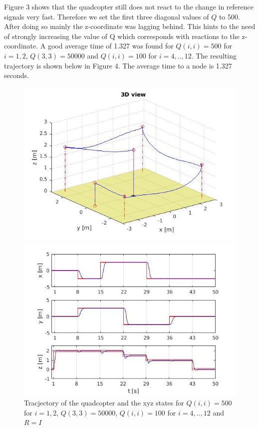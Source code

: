 \documentclass[]{article}
\begin{document}
Figure 3 shows that the quadcopter still does not react to the change in reference signals very fast. Therefore we set the first three diagonal values of $Q$ to 500. After doing so mainly the z-coordinate was lagging behind. This hints to the need of strongly increasing the value of Q which corresponds with reactions to the z-coordinate. A good average time of 1.327 was found for $Q(i,i) = 500$ for $i = 1,2$, $Q(3,3) = 50000$ and $Q(i,i) = 100$ for $i = 4,..,12$. The resulting trajectory is shown below in Figure 4. The average time to a node is 1.327 seconds.

\begin{figure}[H]
\begin{minipage}{.5\textwidth}
\includegraphics[width=\textwidth]{trajectory3.jpg}
\end{minipage}%
\begin{minipage}{.5\textwidth}
\includegraphics[width=\textwidth]{xyz3.jpg}
\end{minipage}
\caption{Tracjectory of the quadcopter and the xyz states for $Q(i,i) = 500$ for $i = 1,2$, $Q(3,3) = 50000$, $Q(i,i) = 100$ for $i = 4,..,12$ and $R = I$}
\end{figure}
\end{document}
